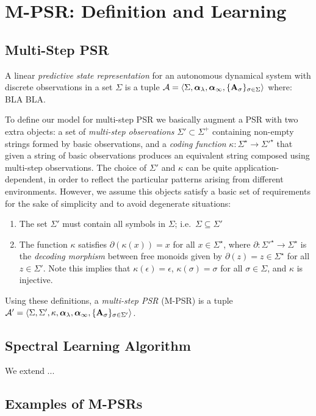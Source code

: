 \section{M-PSR: Definition and Learning}

\subsection{Multi-Step PSR}

A linear \emph{predictive state representation} for an autonomous dynamical system with discrete observations in a set $\Sigma$ is a tuple $\mathcal{A} = \langle \Sigma, \boldsymbol{\alpha}_\lambda, \boldsymbol{\alpha}_{\infty}, \{\mathbf{A}_\sigma\}_{\sigma \in \Sigma} \rangle$ where: BLA BLA.

To define our model for multi-step PSR we basically augment a PSR with two extra objects: a set of \emph{multi-step observations} $\Sigma' \subset \Sigma^+$ containing non-empty strings formed by basic observations, and a \emph{coding function} $\kappa : \Sigma^\star \to {\Sigma'}^{\star}$ that given a string of basic observations produces an equivalent string composed using multi-step observations.
%
The choice of $\Sigma'$ and $\kappa$ can be quite application-dependent, in order to reflect the particular patterns arising from different environments. However, we assume this objects satisfy a basic set of requirements for the sake of simplicity and to avoid degenerate situations:
\begin{enumerate}
\item The set $\Sigma'$ must contain all symbols in $\Sigma$; i.e.\ $\Sigma \subseteq \Sigma'$
\item The function $\kappa$ satisfies $\partial(\kappa(x)) = x$ for all $x \in \Sigma^\star$, where $\partial : {\Sigma'}^\star \to \Sigma^\star$ is the \emph{decoding morphism} between free monoids given by $\partial(z) = z \in \Sigma^\star$ for all $z \in \Sigma'$. Note this implies that $\kappa(\epsilon) = \epsilon$, $\kappa(\sigma) = \sigma$ for all $\sigma \in \Sigma$, and $\kappa$ is injective.
\end{enumerate}

Using these definitions, a \emph{multi-step PSR} (M-PSR) is a tuple $\mathcal{A}' = \langle \Sigma, \Sigma', \kappa, \boldsymbol{\alpha}_\lambda, \boldsymbol{\alpha}_{\infty}, \{\mathbf{A}_\sigma\}_{\sigma \in \Sigma'} \rangle$.

\subsection{Spectral Learning Algorithm}

We extend \cite{bootspsr}...

\subsection{Examples of M-PSRs}

